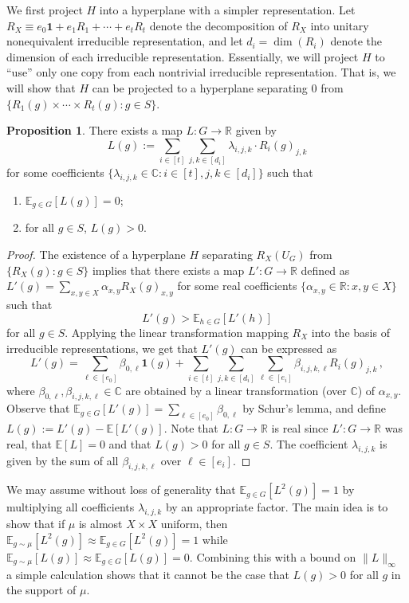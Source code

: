 \documentclass[10pt]{article}
\theoremstyle{definition}
\newtheorem{proposition}[theorem]{Proposition}
\numberwithin{equation}{section}
\newcommand{\R}{{\mathbb R}}
\def\C{\mathbb{C}}
\def\E{\mathbb{E}}
\def\R{\mathbb{R}}
\def\one{\mathbf{1}}
\begin{document}
We first project $H$ into 
%
a hyperplane 
with a simpler representation. Let
$R_X \equiv e_0 \one + e_1 R_1 + \cdots + e_t R_t$ denote the
decomposition of $R_X$ into unitary nonequivalent irreducible
representation, and let $d_i = \dim(R_i)$ denote the dimension of each irreducible representation.
Essentially, we will project $H$ to ``use'' only one copy from each nontrivial
irreducible representation. That is, we will show that $H$ can be
projected to a hyperplane separating $0$ from $\{R_1(g) \times \cdots
\times R_t(g): g \in S\}$.

\begin{proposition}\label{prop:separating_zero_R}
There exists a map $L:G \to \R$ given by
$$
L(g) := \sum_{i \in [t]} \sum_{j,k \in [d_i]}
\lambda_{i,j,k} \cdot R_i(g)_{j,k}
$$
for some coefficients $\{\lambda_{i,j,k}
\in \C: i \in [t], j,k \in [d_i]\}$ such that
\begin{enumerate}
\item $\E_{g \in G}[L(g)]=0$;
\item for all $g \in S$, $L(g)>0$.
\end{enumerate}
\end{proposition}

\begin{proof}
The existence of a hyperplane $H$ separating $R_X(U_G)$ from
$\{R_X(g): g \in S\}$ implies that there exists a map $L':G \to \R$ defined as
$L'(g) = \sum_{x,y \in X} \alpha_{x,y} R_X(g)_{x,y}$
for some real coefficients $\{\alpha_{x,y} \in \R: x,y \in X\}$ such that
$$
L'(g) > \E_{h \in G}[L'(h)]
$$
for all $g \in S$. Applying the linear transformation mapping $R_X$
into the basis of irreducible representations, we get that $L'(g)$
can be expressed as
$$
L'(g) = \sum_{\ell \in [e_0]} \beta_{0,\ell} \one(g)
+ \sum_{i \in [t]} \sum_{j,k \in [d_i]} \sum_{\ell \in [e_i]}
\beta_{i,j,k,\ell} R_i(g)_{j,k}\,,
$$
where $\beta_{0,\ell},\beta_{i,j,k,\ell} \in \C$ are obtained by a linear
transformation (over $\C$) of $\alpha_{x,y}$. Observe that $\E_{g \in
G}[L'(g)] = \sum_{\ell \in [e_0]} \beta_{0,\ell}$ by Schur's lemma,
and define $L(g) := L'(g) - \E[L'(g)]$. Note that $L:G \to \R$ is real
since $L':G \to \R$ was real, that $\E[L]=0$ and that $L(g)>0$ for all
$g \in S$. The coefficient $\lambda_{i,j,k}$ is given by the sum of all
$\beta_{i,j,k,\ell}$ over $\ell \in [e_i]$.
\end{proof}

We may assume without loss of generality that $\E_{g \in G}[L^2(g)]=1$ by multiplying all
coefficients $\lambda_{i,j,k}$ by an appropriate factor. The main idea
is to show that if $\mu$ is almost $X \times X$ uniform, then $\E_{g
\sim \mu}[L^2(g)] \approx \E_{g \in G}[L^2(g)]=1$ while $\E_{g \sim
\mu}[L(g)] \approx \E_{g \in G}[L(g)]=0$. Combining this with a bound
on $\|L\|_{\infty}$ a simple calculation shows that it cannot be the
case that $L(g)>0$ for all $g$ in the support of $\mu$.
\end{document}
